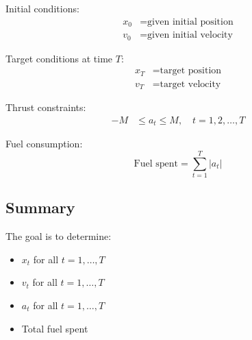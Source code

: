 \documentclass{article}
\begin{document}
Initial conditions:
\begin{align}
    x_0 &= \text{given initial position} \\
    v_0 &= \text{given initial velocity}
\end{align}

Target conditions at time $T$:
\begin{align}
    x_T &= \text{target position} \\
    v_T &= \text{target velocity}
\end{align}

Thrust constraints:
\begin{align}
    -M &\leq a_t \leq M, \quad t = 1, 2, \ldots, T
\end{align}

Fuel consumption:
\[
\text{Fuel spent} = \sum_{t=1}^{T} |a_t|
\]

\subsection*{Summary}

The goal is to determine:
\begin{itemize}
    \item $x_t$ for all $t = 1, \ldots, T$
    \item $v_t$ for all $t = 1, \ldots, T$
    \item $a_t$ for all $t = 1, \ldots, T$
    \item Total fuel spent
\end{itemize}
\end{document}
